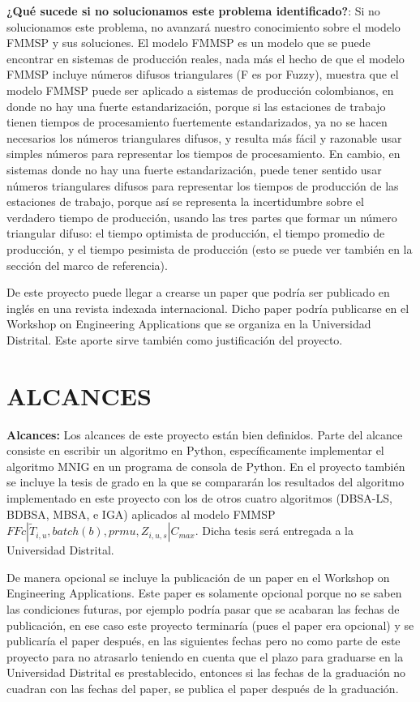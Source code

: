 \documentclass{article}
\def\notac_modelo{$FFc | \tilde{T}_{i, u}, batch(b), prmu, Z_{i, u, s} | C_{max}$}
\begin{document}
\vspace{\baselineskip}
\textbf{¿Qué sucede si no solucionamos este problema identificado?}: Si no solucionamos este problema, no avanzará nuestro conocimiento sobre el modelo FMMSP y sus soluciones. El modelo FMMSP es un modelo que se puede encontrar en sistemas de producción reales, nada más el hecho de que el modelo FMMSP incluye números difusos triangulares (F es por Fuzzy), muestra que el modelo FMMSP puede ser aplicado a sistemas de producción colombianos, en donde no hay una fuerte estandarización, porque si las estaciones de trabajo tienen tiempos de procesamiento fuertemente estandarizados, ya no se hacen necesarios los números triangulares difusos, y resulta más fácil y razonable usar simples números para representar los tiempos de procesamiento. En cambio, en sistemas donde no hay una fuerte estandarización, puede tener sentido usar números triangulares difusos para representar los tiempos de producción de las estaciones de trabajo, porque así se representa la incertidumbre sobre el verdadero tiempo de producción, usando las tres partes que formar un número triangular difuso: el tiempo optimista de producción, el tiempo promedio de producción, y el tiempo pesimista de producción (esto se puede ver también en la sección del marco de referencia).

\vspace{\baselineskip}
De este proyecto puede llegar a crearse un paper que podría ser publicado en inglés en una revista indexada internacional. Dicho paper podría publicarse en el Workshop on Engineering Applications que se organiza en la Universidad Distrital. Este aporte sirve también como justificación del proyecto.

\section{ALCANCES}

\textbf{Alcances:} Los alcances de este proyecto están bien definidos. Parte del alcance consiste en escribir un algoritmo en Python, específicamente implementar el algoritmo MNIG en un programa de consola de Python. En el proyecto también se incluye la tesis de grado en la que se compararán los resultados del algoritmo implementado en este proyecto con los de otros cuatro algoritmos (DBSA-LS, BDBSA, MBSA, e IGA) aplicados al modelo FMMSP \linebreak \notac_modelo. Dicha tesis será entregada a la Universidad Distrital.

\vspace{\baselineskip}
De manera opcional se incluye la publicación de un paper en el Workshop on Engineering Applications. Este paper es solamente opcional porque no se saben las condiciones futuras, por ejemplo podría pasar que se acabaran las fechas de publicación, en ese caso este proyecto terminaría (pues el paper era opcional) y se publicaría el paper después, en las siguientes fechas pero no como parte de este proyecto para no atrasarlo teniendo en cuenta que el plazo para graduarse en la Universidad Distrital es prestablecido, entonces si las fechas de la graduación no cuadran con las fechas del paper, se publica el paper después de la graduación.
\end{document}
